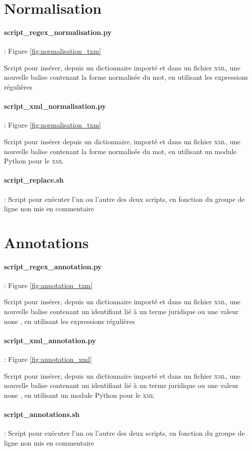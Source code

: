 \section{Normalisation}
\paragraph{script\_regex\_normalisation.py} : Figure \ref{fig:normalisation_txm}

Script pour insérer, depuis un dictionnaire importé et dans un fichier \textsc{xml}, une nouvelle balise contenant la forme normalisée du mot, en utilisant les expressions régulières

\paragraph{script\_xml\_normalisation.py} : Figure \ref{fig:normalisation_txm}

Script pour insérer depuis un dictionnaire, importé et dans un fichier \textsc{xml}, une nouvelle balise contenant la forme normalisée du mot, en utilisant un module Python pour le \textsc{xml}

\paragraph{script\_replace.sh} : Script pour exécuter l'un ou l'autre des deux scripts, en fonction du groupe de ligne non mis en commentaire 

\pagebreak

\section{Annotations}
\paragraph{script\_regex\_annotation.py} : Figure \ref{fig:annotation_txm}

Script pour insérer, depuis un dictionnaire importé et dans un fichier \textsc{xml}, une nouvelle balise contenant un identifiant lié à un terme juridique ou une valeur \og none \fg{}, en utilisant les expressions régulières

\paragraph{script\_xml\_annotation.py} : Figure \ref{fig:annotation_xml}

Script pour insérer, depuis un dictionnaire importé et dans un fichier \textsc{xml}, une nouvelle balise contenant un identifiant lié à un terme juridique ou une valeur \og none \fg{},  en utilisant un module Python pour le \textsc{xml}

\paragraph{script\_annotations.sh} : Script pour exécuter l'un ou l'autre des deux scripts, en fonction du groupe de ligne non mis en commentaire